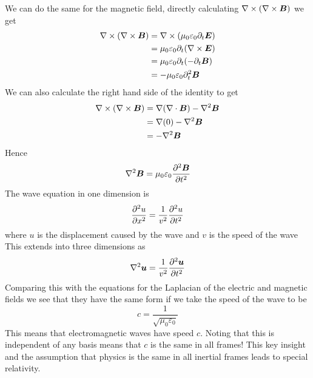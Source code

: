 \documentclass{article}
\begin{document}
    We can do the same for the magnetic field, directly calculating \(\nabla\times(\nabla\times\bm{B})\) we get
    \begin{align*}
        \nabla\times(\nabla\times\bm{B}) &= \nabla\times(\mu_0\varepsilon_0\partial_t\bm{E})\\
        &= \mu_0\varepsilon_0\partial_t(\nabla\times\bm{E})\\
        &= \mu_0\varepsilon_0\partial_t(-\partial_t\bm{B})\\
        &= -\mu_0\varepsilon_0\partial_t^2\bm{B}
    \end{align*}
    We can also calculate the right hand side of the identity to get
    \begin{align*}
        \curl(\curl\vv B) &= \grad(\div\vv B) - \laplacian\vv B\\
        &= \grad(0) - \laplacian\vv B\\
        &= -\laplacian\vv B
    \end{align*}
    Hence
    \[\laplacian\vv B = \mu_0\varepsilon_0\pdv[2]{\vv B}{t}\]
    The wave equation in one dimension is
    \[\pdv[2]{u}{x} = \frac{1}{v^2}\pdv[2]{u}{t}\]
    where \(u\) is the displacement caused by the wave and \(v\) is the speed of the wave
    This extends into three dimensions as
    \[\laplacian\vv u = \frac{1}{v^2}\pdv[2]{\vv u}{t}\]
    Comparing this with the equations for the Laplacian of the electric and magnetic fields we see that they have the same form if we take the speed of the wave to be
    \[c = \frac{1}{\sqrt{\mu_0\varepsilon_0}}\]
    This means that electromagnetic waves have speed \(c\).
    Noting that this is independent of any basis means that \(c\) is the same in all frames!
    This key insight and the assumption that physics is the same in all inertial frames leads to special relativity.
\end{document}
